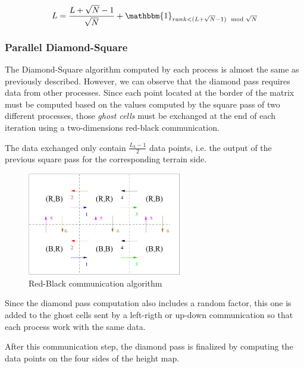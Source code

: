 \begin{equation}
\label{eq:ds_data_complexity}
L = \frac{L + \sqrt{N} - 1}{\sqrt{N}} + 
\mathbbm{1}_{rank < (L + \sqrt{N} - 1) \mod \sqrt{N}}
\end{equation}

\subsubsection{Parallel Diamond-Square}
The Diamond-Square algorithm computed by each process is almost the same as previously described. However, we can observe that the diamond pass requires data from other processes. Since each point located at the border of the matrix must be computed based on the values computed by the square pass of two different processes, those \textit{ghost cells} must be exchanged at the end of each iteration using a two-dimensions red-black communication.

The data exchanged only contain $\frac{L_k - 1}{2}$ data points, i.e. the output of the previous square pass for the corresponding terrain side.

\begin{figure}[H]
\centering
\includegraphics[width=0.6\textwidth]{img/ds_red_black.png}
\caption{Red-Black communication algorithm}
\end{figure}

Since the diamond pass computation also includes a random factor, this one is added to the ghost cells sent by a left-rigth or up-down communication so that each process work with the same data.

After this communication step, the diamond pass is finalized by computing the data points on the four sides of the height map.


